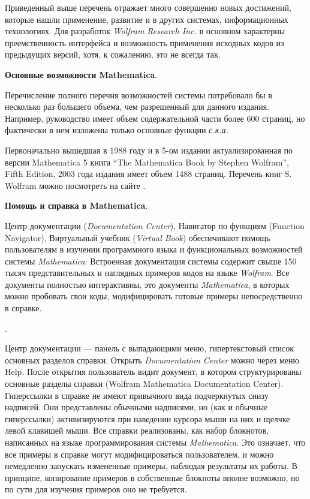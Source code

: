 Приведенный выше перечень отражает много совершенно новых достижений, которые нашли применение, развитие и в других системах, информационных технологиях. Для разработок \textit{Wolfram Research Inc.} в основном характерны преемственность интерфейса и возможность применения исходных кодов из предыдущих версий, хотя, к сожалению, это не всегда так. 

\textbf{Основные возможности Mathematica}.

Перечисление полного перечня возможностей системы потребовало бы в несколько раз большего объема, чем разрешенный для данного издания. Например, руководство  имеет объем содержательной части более 600 страниц, но фактически в нем изложены только основные функции \textit{с.к.а.}

Первоначально вышедшая в 1988 году и в 5-ом издании актуализированная по версии Mathematica 5 книга “The Mathematica Book by Stephen Wolfram”, Fifth Edition, 2003 года издания имеет объем 1488 страниц. Перечень книг S. Wolfram можно посмотреть на сайте .

\textbf{Помощь и справка в Mathematica}.

Центр документации (\textit{Documentation Center}), Навигатор по функциям (Function Navigator), Виртуальный учебник (\textit{Virtual Book}) обеспечивают помощь пользователям в изучении программного языка и функциональных возможностей системы \textit{Mathematica}.
Встроенная документация системы содержит свыше 150 тысяч представительных и наглядных примеров кодов на языке \textit{Wolfram}. Все документы полностью интерактивны, это документы \textit{Mathematica}, в которых можно пробовать свои коды, модифицировать готовые примеры непосредственно в справке.

. 

Центр документации --- панель с выпадающими меню, гипертекстовый список основных разделов справки. Открыть \textit{Documentation Center} можно через меню Help. После открытия пользователь видит документ, в котором структурированы основные разделы справки (Wolfram Mathematica Documentation Center). 
Гиперссылки в справке не имеют привычного вида подчеркнутых снизу надписей. Они представлены обычными надписями, но (как и обычные гиперссылки) активизируются при наведении курсора мыши на них и щелчке левой клавишей мыши. 
Все справки реализованы, как набор блокнотов, написанных на языке программирования системы \textit{Mathematica}. Это означает, что все примеры в справке могут модифицироваться пользователем, и можно немедленно запускать измененные примеры, наблюдая результаты их работы. В принципе, копирование примеров в собственные блокноты вполне возможно, но по сути для изучения примеров оно не требуется.

